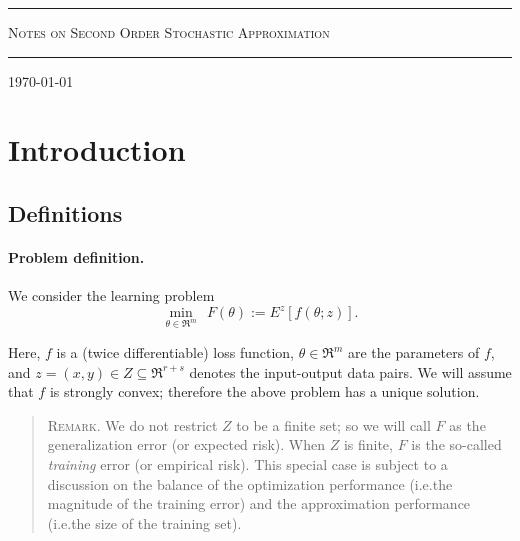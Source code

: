 \documentclass[12pt]{article}
\begin{document}
\newcommand{\tr}{\mbox{tr}}
\newtheorem{theorem}{Theorem}[section]
\newtheorem{lemma}[theorem]{Lemma}
\newtheorem{proposition}[theorem]{Proposition}
\newtheorem{corollary}[theorem]{Corollary}

\begin{titlepage}
 
\hrule
\begin{center}
\large
\textsc{Notes on Second Order Stochastic Approximation}\\
\end{center}
\hrule
\normalsize

\bigskip\bigskip

\centering\today

\bigskip\bigskip

\tableofcontents

\end{titlepage}

\newpage%
\section{Introduction}

\subsection{Definitions}
\paragraph{Problem definition.} 

We consider the learning problem
 \[
  \boxed{\min_{\theta\in\Re^m} \ \ F(\theta) := E^z[f(\theta;z)].}
 \]

Here, $f$ is a (twice differentiable) loss function, $\theta\in\Re^m$ are the parameters of $f$, and $z=(x,y)\in Z \subseteq \Re^{r+s}$ denotes the input-output data pairs.  We will assume that $f$ is strongly convex; therefore the above problem has a unique solution.
 
\bigskip

\footnotesize
\begin{quote}
\textsc{Remark.} We do not restrict $Z$ to be a finite set; so we will call $F$ as the generalization error (or expected risk).  When $Z$ is finite, $F$ is the so-called \emph{training} error (or empirical risk). This special case is subject to a discussion on the balance of the optimization performance (i.e.the magnitude of the training error) and the approximation performance (i.e.the size of the training set)\cite{Bottou:2007}. 
\end{quote}
\normalsize
\end{document}

